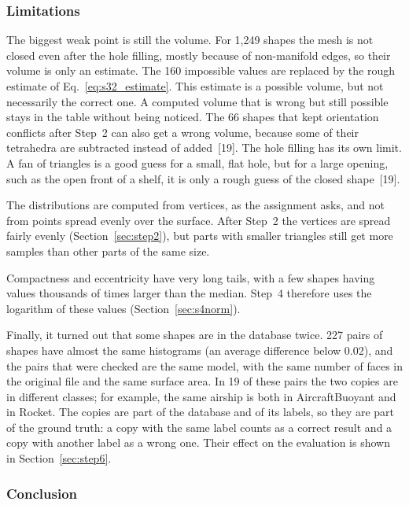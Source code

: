 \documentclass[10pt,a4paper]{article}
\begin{document}
\subsubsection{Limitations}

The biggest weak point is still the volume. For 1,249 shapes the mesh is not closed even after the hole filling, mostly because
of non-manifold edges, so their volume is only an estimate.
The 160 impossible values are replaced by the rough estimate of Eq.~\eqref{eq:s32_estimate}. This estimate is a possible
volume, but not necessarily the correct one. A computed volume that is wrong but still possible stays in the table
without being noticed. The 66 shapes
that kept orientation conflicts after Step~2 can also get a wrong volume, because some of their tetrahedra are subtracted
instead of added~[19]. The hole filling has its own limit. A fan of triangles is a good guess for a small, flat hole, but for a
large opening, such as the open front of a shelf, it is only a rough guess of the closed shape~[19].

The distributions are computed from vertices, as the assignment asks, and not from points spread evenly over the surface. After
Step~2 the vertices are spread fairly evenly (Section~\ref{sec:step2}), but parts with smaller triangles still get more samples
than other parts of the same size.

Compactness and eccentricity have very long tails, with a few shapes having values thousands of times larger than the median.
Step~4 therefore uses the logarithm of these values (Section~\ref{sec:s4norm}).

Finally, it turned out that some shapes are in the database twice. 227 pairs of shapes have almost the same histograms (an
average difference below 0.02), and the pairs that were checked are the same model, with the same number of faces in the original
file and the same surface area. In 19 of these pairs the two copies are in different classes; for example, the same airship is
both in AircraftBuoyant and in Rocket. The copies are part of the database and of its labels, so they are part of the ground
truth: a copy with the same label counts as a correct result and a copy with another label as a wrong one. Their effect on the
evaluation is shown in Section~\ref{sec:step6}.

\subsubsection{Conclusion}
\end{document}

